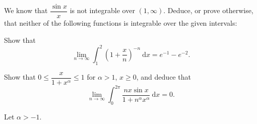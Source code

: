 \documentclass[answers]{exam}
\begin{document}
\begin{questions}
\begin{parts}
\part%
$I=(0, \infty)$, $f(x)=(1+x)^{-1} \cos x$;

\part%
$I=[1, \infty)$, $f(x)=\sin (1 / x)$.
\end{parts}



\question%
We know that $\dfrac{\sin x}{x}$ is not integrable over $(1, \infty)$. Deduce, or prove otherwise, that neither of the following functions is integrable over the given intervals:



\question%
Show that \[
	\lim_{n \to \infty} \int_{1}^{2}\left(1+\frac{x}{n}\right)^{-n} ~\mathrm d x=e^{-1}-e^{-2}.
\]



\question%
Show that $0 \leq \dfrac{x}{1+x^{\alpha}} \leq 1$ for $\alpha>1$, $x \geq 0$, and deduce that \[
	\lim_{n \to \infty} \int_{0}^{2 \pi} \frac{n x \sin x}{1+n^{\alpha} x^{\alpha}}~\mathrm d x=0.
\]



\question%
Let $\alpha>-1$.




\end{questions}
\end{document}
